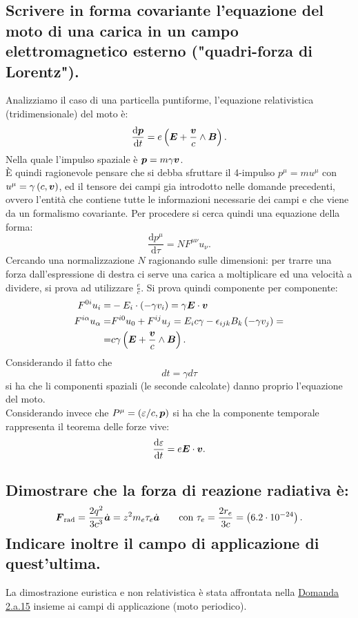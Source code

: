 \subsection[]{Scrivere in forma covariante l'equazione del moto di una carica in un campo elettromagnetico esterno ("quadri-forza di Lorentz").}
\label{sec:3.b.7}
Analizziamo il caso di una particella puntiforme, l'equazione relativistica (tridimensionale) del moto è: \[
	\frac{\mbox{d} \boldsymbol{p}}{\mbox{d} t} = e\left( \boldsymbol{E}+ \frac{\boldsymbol{v}}{c}\wedge \boldsymbol{B} \right) 
.\] 
Nella quale l'impulso spaziale è $\boldsymbol{p}=m\gamma \boldsymbol{v}$.\\
È quindi ragionevole pensare che si debba sfruttare il 4-impulso $p^{\mu}=m u^{\mu}$ con $u^{\mu}=\gamma\left( c, \boldsymbol{v} \right)$, ed il tensore dei campi gia introdotto nelle domande precedenti, ovvero l'entità che contiene tutte le informazioni necessarie dei campi e che viene da un formalismo covariante. Per procedere si cerca quindi una equazione della forma:
\[
	\frac{\mbox{d} p^{\mu}}{\mbox{d} \tau}= N F^{\mu\nu} u_{\nu} 
.\]
Cercando una normalizzazione $N$ ragionando sulle dimensioni: per trarre una forza dall'espressione di destra ci serve una carica a moltiplicare ed una velocità a dividere, si prova ad utilizzare $\frac{e}{c}$. Si prova quindi componente per componente:
\begin{align*}
	F^{0i}u_{i}=& -E_{i}\cdot \left( -\gamma v_{i} \right) =\gamma \boldsymbol{E}\cdot \boldsymbol{v}\\
	F^{i\alpha}u_{\alpha}=&F^{i 0}u_0+F^{ij}u_{j}=E_{i}c\gamma-\epsilon_{ijk}B_{k}\left( -\gamma v_{j} \right) =\\
	=& c\gamma\left(\boldsymbol{E}+\frac{\boldsymbol{v}}{c}\wedge \boldsymbol{B}   \right) 
.\end{align*}
Considerando il fatto che 
\[
	dt= \gamma d\tau
\]
si ha che li componenti spaziali (le seconde calcolate) danno proprio l'equazione del moto.\\
Considerando invece che $P^{\mu}=\left(\varepsilon /c, \boldsymbol{p} \right)$ si ha che la componente temporale rappresenta il teorema delle forze vive:
\[
	\frac{\mbox{d} \varepsilon}{\mbox{d} t} = e \boldsymbol{E}\cdot \boldsymbol{v}	
.\] 


\subsection[]{Dimostrare che la forza di reazione radiativa è: 
\[
	\boldsymbol{F}_{\text{rad}}=\frac{2q^2}{3c^3}\dot{\boldsymbol{a}}=z^2m_e \tau_e \dot{\boldsymbol{a}} \quad \quad \text{con } \tau_e=\frac{2r_{e}}{3c}=\left(6.2\cdot 10^{-24}\right)
.\]
Indicare inoltre il campo di applicazione di quest'ultima.
}\label{sec:3.b.8}
La dimostrazione euristica e non relativistica è stata affrontata nella \hyperref[subsec: 2.a.15]{Domanda 2.a.15} insieme ai campi di applicazione (moto periodico). 

